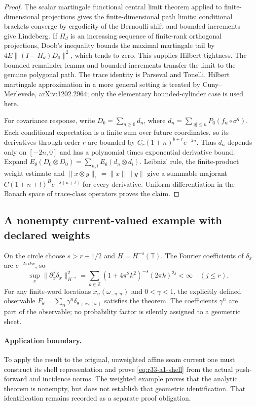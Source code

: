 \begin{proof}
The scalar martingale functional central limit theorem applied to finite-dimensional projections gives the finite-dimensional path limits: conditional brackets converge by ergodicity of the Bernoulli shift and bounded increments give Lindeberg. If $\Pi_d$ is an increasing sequence of finite-rank orthogonal projections, Doob's inequality bounds the maximal martingale tail by $4E\|(I-\Pi_d)D_0\|^2$, which tends to zero. This supplies Hilbert tightness. The bounded remainder lemma and bounded increments transfer the limit to the genuine polygonal path. The trace identity is Parseval and Tonelli. Hilbert martingale approximation in a more general setting is treated by Cuny--Merlevede, arXiv:1202.2964; only the elementary bounded-cylinder case is used here.

For covariance response, write $D_0=\sum_{n\ge0}d_n$, where $d_n=\sum_{|q|\le n}P_0(f_n\circ\sigma^q)$. Each conditional expectation is a finite sum over future coordinates, so its derivatives through order $r$ are bounded by $C_r(1+n)^{b+r}e^{-\lambda n}$. Thus $d_n$ depends only on $[-2n,0]$ and has a polynomial times exponential derivative bound. Expand $E_\theta(D_0\otimes D_0)=\sum_{n,l}E_\theta(d_n\otimes d_l)$. Leibniz' rule, the finite-product weight estimate and $\|x\otimes y\|_1=\|x\|\|y\|$ give a summable majorant $C(1+n+l)^B e^{-\lambda(n+l)}$ for every derivative. Uniform differentiation in the Banach space of trace-class operators proves the claim.
\end{proof}

\subsection{A nonempty current-valued example with declared weights}
On the circle choose $s>r+1/2$ and $H=H^{-s}(\mathbb T)$. The Fourier coefficients of $\delta_x$ are $e^{-2\pi ikx}$, so
\[
 \sup_x\|\partial_x^j\delta_x\|_{H^{-s}}^2
 =\sum_{k\in\mathbb Z}(1+4\pi^2k^2)^{-s}(2\pi k)^{2j}<\infty
 \quad (j\le r).
\]
For any finite-word locations $x_n(\omega_{-n:n})$ and $0<\gamma<1$, the explicitly defined observable
$F_\theta=\sum_n\gamma^n\delta_{\theta+x_n(\omega)}$ satisfies the theorem. The coefficients $\gamma^n$ are part of the observable; no probability factor is silently assigned to a geometric sheet.

\paragraph{Application boundary.}
To apply the result to the original, unweighted affine seam current one must construct its shell representation and prove \eqref{eq:r33-a1-shell} from the actual push-forward and incidence norms. The weighted example proves that the analytic theorem is nonempty, but does not establish that geometric identification. That identification remains recorded as a separate proof obligation.
